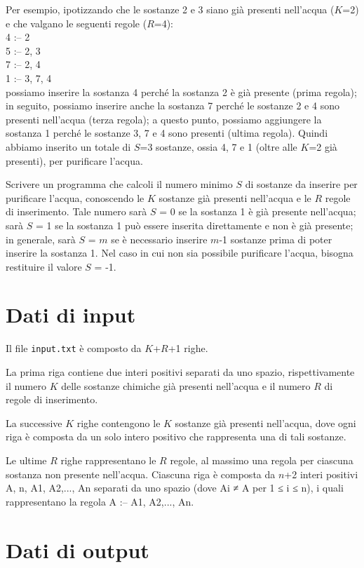 \documentclass[a4paper,11pt]{article}
\begin{document}
Per esempio, ipotizzando che  le sostanze 2 e 3 siano già
presenti nell'acqua ($K$=2) e che valgano le seguenti regole
($R$=4):\\
4 :-- 2\\
5 :-- 2, 3\\
7 :-- 2, 4\\
1 :-- 3, 7, 4\\
possiamo inserire la sostanza 4 perché la sostanza 2 è
già presente (prima regola); in seguito, possiamo inserire
anche la sostanza 7 perché le sostanze 2 e 4 sono presenti
nell'acqua (terza regola); a questo punto, possiamo aggiungere la
sostanza 1 perché le sostanze 3, 7 e 4 sono presenti (ultima
regola). Quindi abbiamo inserito un totale di $S$=3 sostanze, ossia
4, 7 e 1 (oltre alle $K$=2 già presenti), per
purificare l'acqua.

Scrivere un programma che calcoli il numero minimo $S$ di
sostanze da inserire per purificare l'acqua, conoscendo
le $K$ sostanze già presenti nell'acqua e
le $R$ regole di inserimento.  Tale numero
sarà $S$ = 0 se la sostanza 1 è già
presente nell'acqua; sarà $S$ = 1 se la sostanza 1
può essere inserita direttamente e non è già
presente; in generale, sarà $S$ = $m$ se
è necessario inserire $m$-1 sostanze prima di poter
inserire la sostanza 1. Nel caso in cui non sia possibile purificare
l'acqua, bisogna restituire il valore $S$ = -1.


\section*{Dati di input}
  
Il file \texttt{input.txt} è composto da $K$+$R$+1 righe.

La prima riga contiene due interi positivi separati da uno spazio,
rispettivamente il numero $K$ delle sostanze chimiche già
presenti nell'acqua e il numero $R$ di regole di inserimento.

La successive $K$ righe contengono le $K$ sostanze
già presenti nell'acqua, dove ogni riga è composta da un
solo intero positivo che rappresenta una di tali sostanze.

Le ultime $R$ righe rappresentano le $R$ regole, al
massimo una regola per ciascuna sostanza non presente nell'acqua.
Ciascuna riga è composta da $n$+2 interi positivi A, n, A1,
A2,..., An separati da uno spazio (dove Ai ≠ A per 1 ≤ i ≤
n), i quali rappresentano la regola A :-- A1, A2,..., An.


\section*{Dati di output}
  
\end{document}
